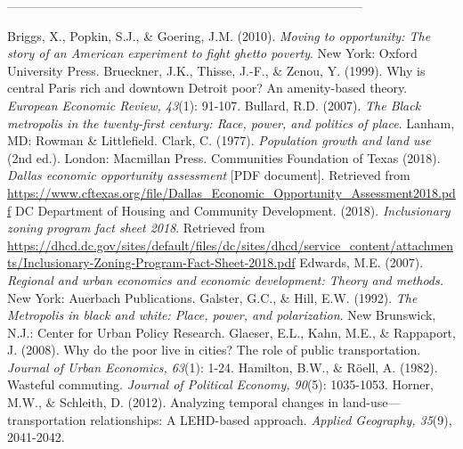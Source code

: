 \documentclass[paper=letter, fontsize=12pt]{scrartcl} %
\begin{document}
--------------------------------------------------------------------------------------
\clearpage

 
\medskip
 
\begin{thebibliography}{9}
Briggs, X., Popkin, S.J., \& Goering, J.M. (2010). \textit{Moving to opportunity: The story of an American experiment to fight ghetto poverty}. New York: Oxford University Press.
Brueckner, J.K., Thisse, J.-F., \& Zenou, Y. (1999). Why is central Paris rich and downtown Detroit poor? An amenity-based theory. \textit{European Economic Review, 43}(1): 91-107.
Bullard, R.D. (2007). \textit{The Black metropolis in the twenty-first century: Race, power, and politics of place}. Lanham, MD: Rowman \& Littlefield.
Clark, C. (1977). \textit{Population growth and land use} (2nd ed.). London: Macmillan Press.
Communities Foundation of Texas (2018). \textit{Dallas economic opportunity assessment} [PDF document]. Retrieved from \href{https://www.cftexas.org/file/Dallas_Economic_Opportunity_Assessment2018.pdf}{https://www.cftexas.org/file/Dallas\_Economic\_Opportunity\_Assessment2018.pdf}
DC Department of Housing and Community Development. (2018). \textit{Inclusionary zoning program fact sheet 2018}. Retrieved from \href{https://dhcd.dc.gov/sites/default/files/dc/sites/dhcd/service_content/attachments/Inclusionary\%20Zoning\%20Program\%20Fact\%20Sheet\%202018.pdf}{https://dhcd.dc.gov/sites/default/files/dc/sites/dhcd/service\_content/attachments/Inclusionary-Zoning-Program-Fact-Sheet-2018.pdf}
Edwards, M.E. (2007). \textit{Regional and urban economics and economic development: Theory and methods.} New York: Auerbach Publications.
Galster, G.C., \& Hill, E.W. (1992). \textit{The Metropolis in black and white: Place, power, and polarization}. New Brunswick, N.J.: Center for Urban Policy Research.
Glaeser, E.L., Kahn, M.E., \& Rappaport, J. (2008). Why do the poor live in cities? The role of public transportation. \textit{Journal of Urban Economics, 63}(1): 1-24.
Hamilton, B.W., \& R\"oell, A. (1982). Wasteful commuting. \textit{Journal of Political Economy, 90}(5): 1035-1053.
Horner, M.W., \& Schleith, D. (2012). Analyzing temporal changes in land-use---transportation relationships: A LEHD-based approach. \textit{Applied Geography, 35}(9), 2041-2042.

\end{thebibliography}
\end{document}
